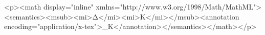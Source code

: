 <p><math display="inline" xmlns="http://www.w3.org/1998/Math/MathML"><semantics><msub><mi>Δ</mi><mi>K</mi></msub><annotation encoding="application/x-tex">\Delta_{K}</annotation></semantics></math></p>
